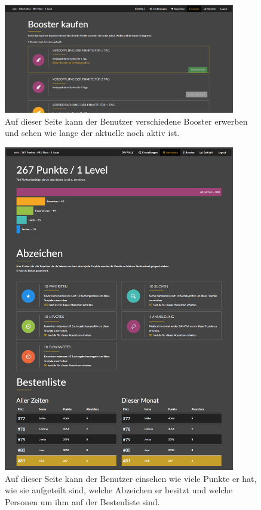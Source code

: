 \documentclass[12pt,twoside]{book}
\begin{document}
\begin{figure}[H]
    \centering
    \includegraphics[width=0.9\textwidth]{images/infoboard_booster.png}
    \caption{Auf dieser Seite kann der Benutzer verschiedene Booster erwerben und sehen wie lange der aktuelle noch aktiv ist.}
    \label{fig:booster}
\end{figure}

\begin{figure}[H]
    \centering
    \includegraphics[width=0.9\textwidth]{images/infoboard_usersite.png}
    \caption{Auf dieser Seite kann der Benutzer einsehen wie viele Punkte er hat, wie sie aufgeteilt sind, welche Abzeichen er besitzt und welche Personen um ihm auf der Bestenliste sind. }
    \label{fig:usersite}
\end{figure}
\end{document}
